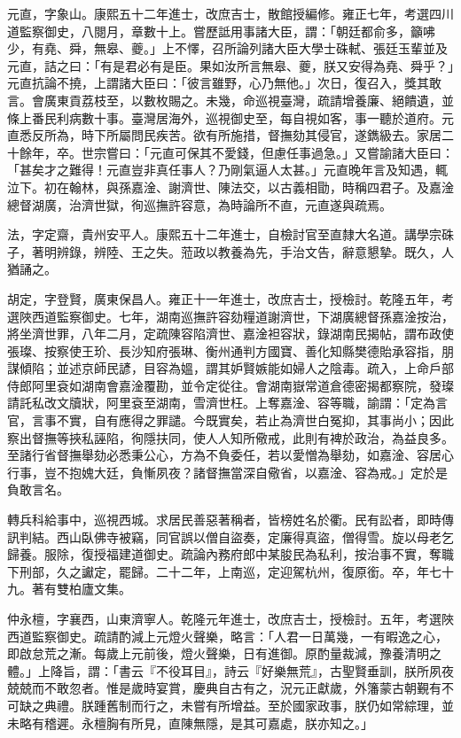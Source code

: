 \begin{pinyinscope}
元直，字象山。康熙五十二年進士，改庶吉士，散館授編修。雍正七年，考選四川道監察御史，八閱月，章數十上。嘗歷詆用事諸大臣，謂：「朝廷都俞多，籲咈少，有堯、舜，無皋、夔。」上不懌，召所論列諸大臣大學士硃軾、張廷玉輩並及元直，詰之曰：「有是君必有是臣。果如汝所言無皋、夔，朕又安得為堯、舜乎？」元直抗論不撓，上謂諸大臣曰：「彼言雖野，心乃無他。」次日，復召入，獎其敢言。會廣東貢荔枝至，以數枚賜之。未幾，命巡視臺灣，疏請增養廉、絕饋遺，並條上番民利病數十事。臺灣居海外，巡視御史至，每自視如客，事一聽於道府。元直悉反所為，時下所屬問民疾苦。欲有所施措，督撫劾其侵官，遂鐫級去。家居二十餘年，卒。世宗嘗曰：「元直可保其不愛錢，但慮任事過急。」又嘗諭諸大臣曰：「甚矣才之難得！元直豈非真任事人？乃剛氣逼人太甚。」元直晚年言及知遇，輒泣下。初在翰林，與孫嘉淦、謝濟世、陳法交，以古義相勖，時稱四君子。及嘉淦總督湖廣，治濟世獄，徇巡撫許容意，為時論所不直，元直遂與疏焉。

法，字定齋，貴州安平人。康熙五十二年進士，自檢討官至直隸大名道。講學宗硃子，著明辨錄，辨陸、王之失。蒞政以教養為先，手治文告，辭意懇摯。既久，人猶誦之。

胡定，字登賢，廣東保昌人。雍正十一年進士，改庶吉士，授檢討。乾隆五年，考選陜西道監察御史。七年，湖南巡撫許容劾糧道謝濟世，下湖廣總督孫嘉淦按治，將坐濟世罪，八年二月，定疏陳容陷濟世、嘉淦袒容狀，錄湖南民揭帖，謂布政使張璨、按察使王玠、長沙知府張琳、衡州通判方國寶、善化知縣樊德貽承容指，朋謀傾陷；並述京師民諺，目容為媼，謂其妒賢嫉能如婦人之陰毒。疏入，上命戶部侍郎阿里袞如湖南會嘉淦覆勘，並令定從往。會湖南嶽常道倉德密揭都察院，發璨請託私改文牘狀，阿里袞至湖南，雪濟世枉。上奪嘉淦、容等職，諭謂：「定為言官，言事不實，自有應得之罪譴。今既實矣，若止為濟世白冤抑，其事尚小；因此察出督撫等挾私誣陷，徇隱扶同，使人人知所儆戒，此則有裨於政治，為益良多。至諸行省督撫舉劾必悉秉公心，方為不負委任，若以愛憎為舉劾，如嘉淦、容居心行事，豈不抱媿大廷，負慚夙夜？諸督撫當深自儆省，以嘉淦、容為戒。」定於是負敢言名。

轉兵科給事中，巡視西城。求居民善惡著稱者，皆榜姓名於衢。民有訟者，即時傳訊判結。西山臥佛寺被竊，同官誤以僧自盜奏，定廉得真盜，僧得雪。旋以母老乞歸養。服除，復授福建道御史。疏論內務府郎中某朘民為私利，按治事不實，奪職下刑部，久之讞定，罷歸。二十二年，上南巡，定迎駕杭州，復原銜。卒，年七十九。著有雙柏廬文集。

仲永檀，字襄西，山東濟寧人。乾隆元年進士，改庶吉士，授檢討。五年，考選陜西道監察御史。疏請酌減上元燈火聲樂，略言：「人君一日萬幾，一有暇逸之心，即啟怠荒之漸。每歲上元前後，燈火聲樂，日有進御。原酌量裁減，豫養清明之體。」上降旨，謂：「書云『不役耳目』，詩云『好樂無荒』，古聖賢垂訓，朕所夙夜兢兢而不敢忽者。惟是歲時宴賞，慶典自古有之，況元正獻歲，外籓蒙古朝覲有不可缺之典禮。朕踵舊制而行之，未嘗有所增益。至於國家政事，朕仍如常綜理，並未略有稽遲。永檀胸有所見，直陳無隱，是其可嘉處，朕亦知之。」


\end{pinyinscope}

